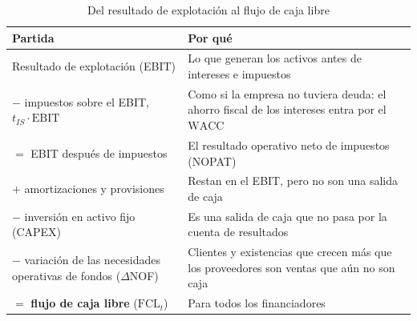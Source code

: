 \documentclass[11pt]{article}
\begin{document}
\begin{table}[H]
\centering
\caption{Del resultado de explotación al flujo de caja libre}\label{tab:fcl}
\begin{tabular}{>{\raggedright\arraybackslash}m{5.4cm}>{\raggedright\arraybackslash}m{8.6cm}}
\toprule
\rowcolor{tceeazulpalido}\textbf{Partida} & \textbf{Por qué} \\
\midrule
Resultado de explotación (EBIT) & Lo que generan los activos antes de intereses e impuestos \\
$-$ impuestos sobre el EBIT, $t_{IS}\cdot\mathrm{EBIT}$ & Como si la empresa no tuviera deuda: el ahorro fiscal de los intereses entra por el $\mathrm{WACC}$ \\
\rowcolor{tceesalvia}$=$ EBIT después de impuestos & El resultado operativo neto de impuestos (NOPAT) \\
$+$ amortizaciones y provisiones & Restan en el EBIT, pero no son una salida de caja \\
$-$ inversión en activo fijo (CAPEX) & Es una salida de caja que no pasa por la cuenta de resultados \\
$-$ variación de las necesidades operativas de fondos ($\Delta$NOF) & Clientes y existencias que crecen más que los proveedores son ventas que aún no son caja \\
\rowcolor{tceesalvia}$=$ \textbf{flujo de caja libre} ($\mathrm{FCL}_t$) & Para todos los financiadores \\
\bottomrule
\end{tabular}
\end{table}
\end{document}
